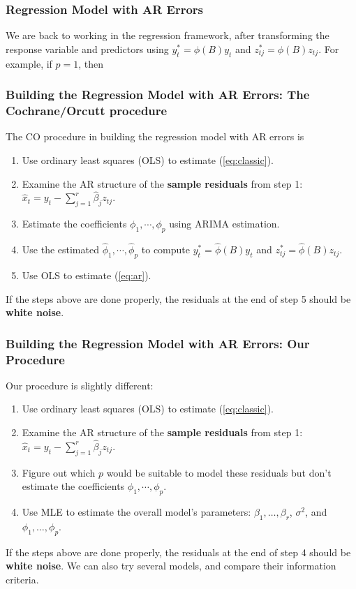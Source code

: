 \documentclass[%
xcolor=pdftex]{beamer}
\begin{document}
\begin{frame}
\frametitle{Regression Model with AR Errors}

We are back to working in the regression framework, after transforming the response variable and predictors using $y_t^* = \phi(B) y_t$ and $z_{tj}^* = \phi(B) z_{tj}$. For example, if $p=1$, then

\vspace{40mm}

\end{frame}




\begin{frame}
\frametitle{Building the Regression Model with AR Errors: The Cochrane/Orcutt procedure}

The CO procedure in building the regression model with AR errors is

\begin{enumerate}
\item Use ordinary least squares (OLS) to estimate (\ref{eq:classic}).
\item Examine the AR structure of the \textbf{sample residuals} from step 1: $\hat{x}_t = y_t - \sum_{j=1}^r \hat{\beta}_j z_{tj}$.
\item Estimate the coefficients $\phi_1, \cdots, \phi_p$ using ARIMA estimation.
\item Use the estimated $\hat{\phi}_1, \cdots, \hat{\phi}_p$ to compute $y_t^* = \hat{\phi}(B)y_t$ and $z_{tj}^* = \hat{\phi}(B)z_{tj}$.
\item Use OLS to estimate (\ref{eq:ar}).
\end{enumerate}

If the steps above are done properly, the residuals at the end of step 5 should be \textbf{white noise}.


\end{frame}


\begin{frame}
\frametitle{Building the Regression Model with AR Errors: Our Procedure}


Our procedure is slightly different:

\begin{enumerate}
\item Use ordinary least squares (OLS) to estimate (\ref{eq:classic}).
\item Examine the AR structure of the \textbf{sample residuals} from step 1: $\hat{x}_t = y_t - \sum_{j=1}^r \hat{\beta}_j z_{tj}$.
\item Figure out which $p$ would be suitable to model these residuals but don't estimate the coefficients $\phi_1, \cdots, \phi_p$.
\item Use MLE to estimate the overall model's parameters: $\beta_1, \ldots, \beta_r$, $\sigma^2$, and $\phi_1, \ldots, \phi_p$.
\end{enumerate}

If the steps above are done properly, the residuals at the end of step 4 should be \textbf{white noise}. We can also try several models, and compare their information criteria.


\end{frame}
\end{document}
